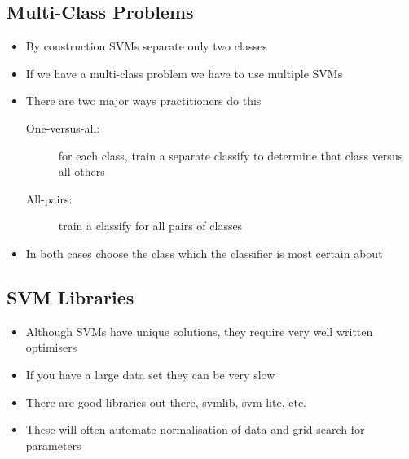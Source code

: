 
\begin{slide}
\section{Multi-Class Problems}

\begin{PauseHighLight}
  \begin{itemize}
  \item By construction SVMs separate only two classes\pause
  \item If we have a multi-class problem we have to use multiple
    SVMs\pause
  \item There are two major ways practitioners do this
    \begin{description}
    \item[One-versus-all:] for each class, train a separate classify to
      determine that class versus all others\pause
    \item[All-pairs:] train a classify for all pairs of classes\pause
    \end{description}
  \item In both cases choose the class which the classifier is most
    certain about\pause
  \end{itemize}
\end{PauseHighLight}

\end{slide}



\begin{slide}
\section{SVM Libraries}

\begin{PauseHighLight}
  \begin{itemize}
  \item Although SVMs have unique solutions, they require very well
    written optimisers\pause
  \item If you have a large data set they can be very slow\pause
  \item There are good libraries out there, svmlib, svm-lite, etc.\pause
  \item These will often automate normalisation of data and grid search
    for parameters\pause
  \end{itemize}
\end{PauseHighLight}

\end{slide}




